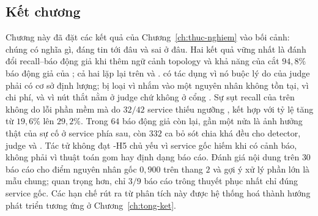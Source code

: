 \subsection{Kết chương}
\label{sec:ch7-ket-chuong}

Chương này đã đặt các kết quả của Chương~\ref{ch:thuc-nghiem} vào bối cảnh: chúng có nghĩa gì, đáng tin tới đâu và sai ở đâu. Hai kết quả vững nhất là đánh đổi recall--báo động giả khi thêm ngữ cảnh topology và khả năng của  cắt $94{,}8\%$ báo động giả của ; cả hai lặp lại trên  và .  có tác dụng vì nó buộc lý do của judge phải có cơ sở định lượng;  bị loại vì nhắm vào một nguyên nhân không tồn tại,  vì chi phí, và  vì nút thắt nằm ở judge chứ không ở cổng . Sự sụt recall của \CTAV{} trên  không do lỗi phần mềm mà do $32/42$ service thiếu ngưỡng , kết hợp với tỷ lệ  tăng từ $19{,}6\%$ lên $29{,}2\%$. Trong $64$ báo động giả còn lại, gần một nửa là ảnh hưởng thật của sự cố ở service phía sau, còn $332$ ca bỏ sót chia khá đều cho detector, judge và . Tác tử  không đạt \hyp{H5} chủ yếu vì service gốc hiếm khi có cảnh báo, không phải vì thuật toán gom hay định dạng báo cáo. Đánh giá nội dung trên $30$ báo cáo cho điểm nguyên nhân gốc $0{,}900$ trên thang $2$ và gợi ý xử lý phần lớn là mẫu chung; quan trọng hơn, chỉ $3/9$ báo cáo trông thuyết phục nhất chỉ đúng service gốc.
Các hạn chế rút ra từ phân tích này được hệ thống hoá thành hướng phát triển tương ứng ở Chương~\ref{ch:tong-ket}.
